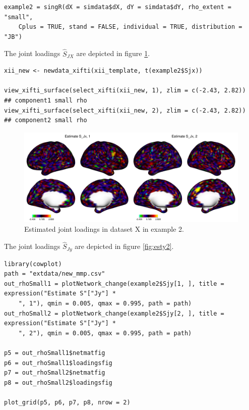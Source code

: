 \begin{verbatim}
example2 = singR(dX = simdata$dX, dY = simdata$dY, rho_extent = "small",
    Cplus = TRUE, stand = FALSE, individual = TRUE, distribution = "JB")
\end{verbatim}

The joint loadings \(\widehat{S}_{JX}\) are depicted in figure \ref{fig:estx2}.

\begin{verbatim}
xii_new <- newdata_xifti(xii_template, t(example2$Sjx))

view_xifti_surface(select_xifti(xii_new, 1), zlim = c(-2.43, 2.82))  ## component1 small rho
view_xifti_surface(select_xifti(xii_new, 2), zlim = c(-2.43, 2.82))  ## component2 small rho
\end{verbatim}

\begin{figure}
\includegraphics[width=1\linewidth]{figures/Est_SJx12_brain} \caption{Estimated joint loadings in dataset X in example 2.}\label{fig:estx2}
\end{figure}

The joint loadings \(\widehat{S}_{Jy}\) are depicted in figure \ref{fig:esty2}.

\begin{verbatim}
library(cowplot)
path = "extdata/new_mmp.csv"
out_rhoSmall1 = plotNetwork_change(example2$Sjy[1, ], title = expression("Estimate S"["Jy"] *
    ", 1"), qmin = 0.005, qmax = 0.995, path = path)
out_rhoSmall2 = plotNetwork_change(example2$Sjy[2, ], title = expression("Estimate S"["Jy"] *
    ", 2"), qmin = 0.005, qmax = 0.995, path = path)

p5 = out_rhoSmall1$netmatfig
p6 = out_rhoSmall1$loadingsfig
p7 = out_rhoSmall2$netmatfig
p8 = out_rhoSmall2$loadingsfig

plot_grid(p5, p6, p7, p8, nrow = 2)
\end{verbatim}

